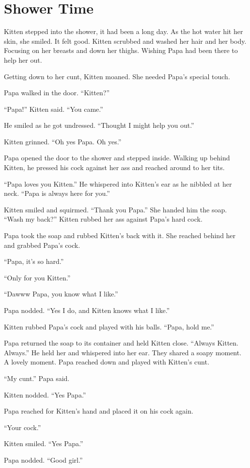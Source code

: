\section{Shower Time}

Kitten stepped into the shower, it had been a long day. As the hot water hit her skin, she smiled. It felt good. Kitten scrubbed and washed her hair and her body. Focusing on her breasts and down her thighs. Wishing Papa had been there to help her out.

    Getting down to her cunt, Kitten moaned. She needed Papa’s special touch.

    Papa walked in the door. “Kitten?”

    “Papa!” Kitten said. “You came.”

    He smiled as he got undressed. “Thought I might help you out.”

    Kitten grinned. “Oh yes Papa. Oh yes.”

    Papa opened the door to the shower and stepped inside. Walking up behind Kitten, he pressed his cock against her ass and reached around to her tits.

    “Papa loves you Kitten.” He whispered into Kitten’s ear as he nibbled at her neck. “Papa is always here for you.”

    Kitten smiled and squirmed. “Thank you Papa.” She handed him the soap. “Wash my back?” Kitten rubbed her ass against Papa’s hard cock.

    Papa took the soap and rubbed Kitten’s back with it. She reached behind her and grabbed Papa’s cock.

    “Papa, it’s so hard.”

    “Only for you Kitten.”

    “Dawww Papa, you know what I like.”

    Papa nodded. “Yes I do, and Kitten knows what I like.”

    Kitten rubbed Papa’s cock and played with his balls. “Papa, hold me.”

    Papa returned the soap to its container and held Kitten close. “Always Kitten. Always.” He held her and whispered into her ear. They shared a soapy moment. A lovely moment. Papa reached down and played with Kitten’s cunt.

    “My cunt.” Papa said.

    Kitten nodded. “Yes Papa.”

    Papa reached for Kitten’s hand and placed it on his cock again.

    “Your cock.”

    Kitten smiled. “Yes Papa.”

    Papa nodded. “Good girl.”
